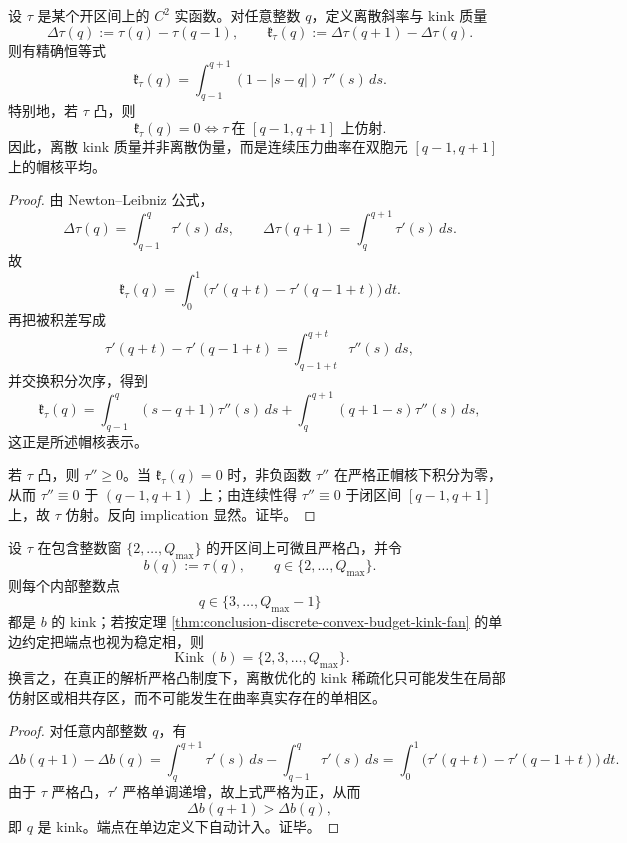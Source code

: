 \begin{theorem}\label{thm:conclusion-discrete-kink-mass-hat-kernel-curvature}
设 \(\tau\) 是某个开区间上的 \(C^2\) 实函数。对任意整数 \(q\)，定义离散斜率与 kink 质量
\[
\Delta\tau(q):=\tau(q)-\tau(q-1),
\qquad
\mathfrak k_\tau(q):=\Delta\tau(q+1)-\Delta\tau(q).
\]
则有精确恒等式
\[
\mathfrak k_\tau(q)
=
\int_{q-1}^{q+1}(1-|s-q|)\,\tau''(s)\,ds.
\]
特别地，若 \(\tau\) 凸，则
\[
\mathfrak k_\tau(q)=0
\iff
\tau\ \text{在 }[q-1,q+1]\text{ 上仿射}.
\]
因此，离散 kink 质量并非离散伪量，而是连续压力曲率在双胞元 \([q-1,q+1]\) 上的帽核平均。
\end{theorem}
\begin{proof}
由 Newton--Leibniz 公式，
\[
\Delta\tau(q)=\int_{q-1}^{q}\tau'(s)\,ds,
\qquad
\Delta\tau(q+1)=\int_{q}^{q+1}\tau'(s)\,ds.
\]
故
\[
\mathfrak k_\tau(q)
=
\int_0^1\bigl(\tau'(q+t)-\tau'(q-1+t)\bigr)\,dt.
\]
再把被积差写成
\[
\tau'(q+t)-\tau'(q-1+t)=\int_{q-1+t}^{q+t}\tau''(s)\,ds,
\]
并交换积分次序，得到
\[
\mathfrak k_\tau(q)
=
\int_{q-1}^{q}(s-q+1)\tau''(s)\,ds
+
\int_{q}^{q+1}(q+1-s)\tau''(s)\,ds,
\]
这正是所述帽核表示。

若 \(\tau\) 凸，则 \(\tau''\ge 0\)。当 \(\mathfrak k_\tau(q)=0\) 时，非负函数 \(\tau''\) 在严格正帽核下积分为零，从而 \(\tau''\equiv 0\) 于 \((q-1,q+1)\) 上；由连续性得 \(\tau''\equiv 0\) 于闭区间 \([q-1,q+1]\) 上，故 \(\tau\) 仿射。反向 implication 显然。证毕。
\end{proof}

\begin{theorem}\label{thm:conclusion-strictly-convex-pressure-full-kink}
设 \(\tau\) 在包含整数窗 \(\{2,\dots,Q_{\max}\}\) 的开区间上可微且严格凸，并令
\[
b(q):=\tau(q),
\qquad
q\in\{2,\dots,Q_{\max}\}.
\]
则每个内部整数点
\[
q\in\{3,\dots,Q_{\max}-1\}
\]
都是 \(b\) 的 kink；若按定理 \ref{thm:conclusion-discrete-convex-budget-kink-fan} 的单边约定把端点也视为稳定相，则
\[
\operatorname{Kink}(b)=\{2,3,\dots,Q_{\max}\}.
\]
换言之，在真正的解析严格凸制度下，离散优化的 kink 稀疏化只可能发生在局部仿射区或相共存区，而不可能发生在曲率真实存在的单相区。
\end{theorem}
\begin{proof}
对任意内部整数 \(q\)，有
\[
\Delta b(q+1)-\Delta b(q)
=
\int_{q}^{q+1}\tau'(s)\,ds-\int_{q-1}^{q}\tau'(s)\,ds
=
\int_0^1\bigl(\tau'(q+t)-\tau'(q-1+t)\bigr)\,dt.
\]
由于 \(\tau\) 严格凸，\(\tau'\) 严格单调递增，故上式严格为正，从而
\[
\Delta b(q+1)>\Delta b(q),
\]
即 \(q\) 是 kink。端点在单边定义下自动计入。证毕。
\end{proof}

